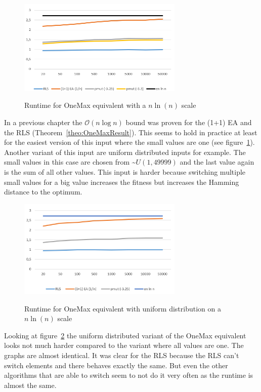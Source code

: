 \begin{figure}[h]
      \caption{Runtime for OneMax equivalent with a $n\ln(n)$ scale}
      \centering
      \includegraphics[width=0.7\textwidth]{figures/images/oneMaxMultipleN.png}\label{fig:onemaxNlogNBound}
\end{figure}

In a previous chapter the $\mathcal{O}(n\log n)$ bound was proven for the (1+1) EA and the RLS (Theorem~\ref{theo:OneMaxResult}).
This seems to hold in practice at least for the easiest version of this input where the small values are one (see figure~\ref{fig:onemaxNlogNBound}).
Another variant of this input are uniform distributed inputs for example.
The small values in this case are chosen from \textasciitilde$U(1,49999)$ and the last value again is the sum of all other values.
This input is harder because switching multiple small values for a big value increases the fitness but increases the Hamming distance to the optimum.

\begin{figure}[h]
      \caption{Runtime for OneMax equivalent with uniform distribution on a $n\ln(n)$ scale}
      \centering
      \includegraphics[width=0.7\textwidth]{figures/images/oneMaxUniformMultipleN.png}\label{fig:onemaxUniformNlogNBound}
\end{figure}

Looking at figure~\ref{fig:onemaxUniformNlogNBound} the uniform distributed variant of the OneMax equivalent looks not much harder compared to the variant where all values are one.
The graphs are almost identical.
It was clear for the RLS because the RLS can't switch elements and there behaves exactly the same.
But even the other algorithms that are able to switch seem to not do it very often as the runtime is almost the same.